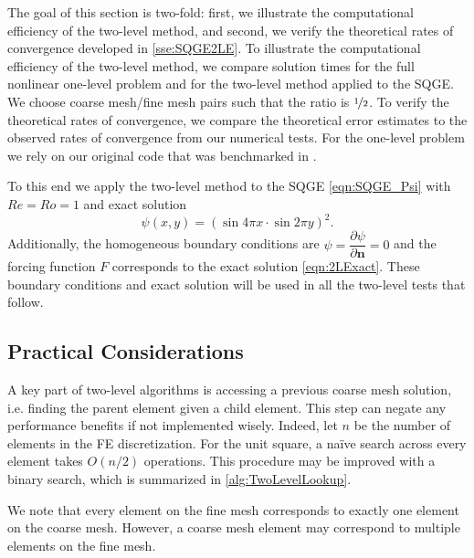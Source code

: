 The goal of this section is two-fold: first, we illustrate the computational
efficiency of the two-level method, and second, we verify the theoretical rates
of convergence developed in \autoref{sse:SQGE2LE}.  To illustrate the
computational efficiency of the two-level method, we compare solution times for
the full nonlinear one-level problem and for the two-level method applied to the
SQGE. We choose coarse mesh/fine mesh pairs such that the ratio is
$\nicefrac{1}{2}$. To verify the theoretical rates of convergence, we compare
the theoretical error estimates to the observed rates of convergence from our
numerical tests. For the one-level problem we rely on our original code that was
benchmarked in \cite{Foster}.

To this end we apply the two-level method to the SQGE \eqref{eqn:SQGE_Psi}
with $Re=Ro=1$ and exact solution
\begin{equation}
  \psi(x,y) = \left(\sin 4\pi x \cdot \sin 2\pi y\right)^2.
  \label{eqn:2LExact}
\end{equation}
Additionally, the homogeneous boundary conditions are $\psi=\dfrac{\partial
\psi}{\partial \mathbf{n}}=0$ and the forcing function $F$ corresponds to the exact
solution \eqref{eqn:2LExact}. These boundary conditions and exact solution will
be used in all the two-level tests that follow.

\subsection{Practical Considerations}
A key part of two-level algorithms is accessing a previous coarse mesh solution,
i.e. finding the parent element given a child element. This step can negate any
performance benefits if not implemented wisely. Indeed, let $ n $ be the number
of elements in the FE discretization. For the unit square, a na\"{i}ve search
across every element takes $ O(n/2) $ operations. This procedure may be improved
with a binary search, which is summarized in \autoref{alg:TwoLevelLookup}.

We note that every element on the fine mesh corresponds to exactly one element
on the coarse mesh. However, a coarse mesh element may correspond to multiple
elements on the fine mesh.

